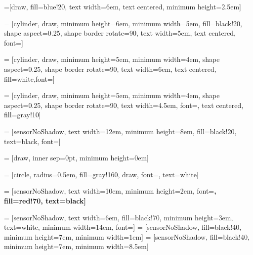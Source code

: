 
=[draw, fill=blue!20, text width=6em,
    text centered, minimum height=2.5em]

 = [cylinder, draw, minimum height=6em, minimum width=5em,
fill=black!20, shape aspect=0.25, shape border rotate=90, text width=5em, text centered, font=\normalsize]

 = [cylinder, draw, minimum height=5em, minimum width=4em,
shape aspect=0.25, shape border rotate=90, text width=6em, text centered, fill=white,font=\normalsize]

 = [cylinder, draw, minimum height=5em, minimum width=4em,
shape aspect=0.25, shape border rotate=90, text width=4.5em, font=\normalsize, text centered, fill=gray!10]

 = [sensorNoShadow, text width=12em, minimum height=8em, fill=black!20, text=black, font=\large]

 = [draw, inner sep=0pt, minimum height=0em]

 = [circle, radius=0.5em, fill=gray!160, draw, font=\normalsize, text=white]

 = [sensorNoShadow, text width=10em, minimum height=2em,
font=\bfseries, fill=red!70, text=black]

 = [sensorNoShadow, text width=6em, fill=black!70,
minimum height=3em, text=white, minimum width=14em, font=\normalsize]
 = [sensorNoShadow,  fill=black!40, minimum height=7em, minimum width=1em]
 = [sensorNoShadow, fill=black!40, minimum height=7em, minimum width=8.5em]




